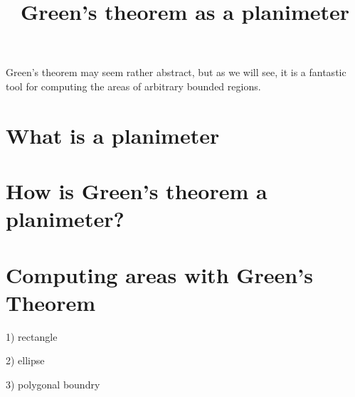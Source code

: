 \documentclass{ximera}
\title[Dig-In:]{Green's theorem as a planimeter}
\begin{document}
\begin{abstract}
\end{abstract}
\maketitle


Green's theorem may seem rather abstract, but as we will see, it is a
fantastic tool for computing the areas of arbitrary bounded regions.

\section{What is a planimeter}

\section{How is Green's theorem a planimeter?}

\section{Computing areas with Green's Theorem}

1) rectangle

2) ellipse

3) polygonal boundry
\end{document}

